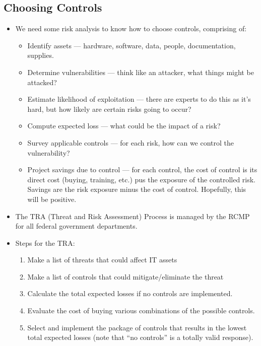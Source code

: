 \documentclass{article}
\begin{document}
\subsection{Choosing Controls}
\begin{itemize}
    \item We need some risk analysis to know how to choose controls, comprising of:
        \begin{itemize}
            \item Identify assets --- hardware, software, data, people, documentation, supplies.
            \item Determine vulnerabilities --- think like an attacker, what things might be attacked?
            \item Estimate likelihood of exploitation --- there are experts to do this as it's hard, but how likely are certain risks going to occur?
            \item Compute expected loss --- what could be the impact of a risk?
            \item Survey applicable controls --- for each risk, how can we control the vulnerability?
            \item Project savings due to control --- for each control, the cost of control is its direct cost (buying, training, etc.) pus the exposure of the controlled risk.  Savings are the risk exposure minus the cost of control.  Hopefully, this will be positive.
        \end{itemize}
    \item The TRA (Threat and Risk Assessment) Process is managed by the RCMP for all federal government departments.
    \item Steps for the TRA:
        \begin{enumerate}
            \item Make a list of threats that could affect IT assets
            \item Make a list of controls that could mitigate/eliminate the threat
            \item Calculate the total expected losses if no controls are implemented.
            \item Evaluate the cost of buying various combinations of the possible controls.
            \item Select and implement the package of controls that results in the lowest total expected losses (note that ``no controls'' is a totally valid response).
        \end{enumerate}
\end{itemize}
\end{document}

